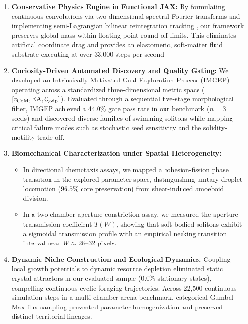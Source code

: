 \begin{enumerate}
    \item \textbf{Conservative Physics Engine in Functional JAX:} By formulating continuous convolutions via two-dimensional spectral Fourier transforms and implementing semi-Lagrangian bilinear reintegration tracking \parencite{moroz2020reintegration, plantec2025flowlenia}, our framework preserves global mass within floating-point round-off limits. This eliminates artificial coordinate drag and provides an elastomeric, soft-matter fluid substrate executing at over 33,000 steps per second.
    \item \textbf{Curiosity-Driven Automated Discovery and Quality Gating:} We developed an Intrinsically Motivated Goal Exploration Process (IMGEP) operating across a standardized three-dimensional metric space ($[v_{\text{CoM}}, \text{EA}, \mathcal{C}_{\text{gzip}}]$). Evaluated through a sequential five-stage morphological filter, IMGEP achieved a 44.0\% gate pass rate in our benchmark ($n=3$ seeds) and discovered diverse families of swimming solitons while mapping critical failure modes such as stochastic seed sensitivity and the solidity-motility trade-off.
    \item \textbf{Biomechanical Characterization under Spatial Heterogeneity:} 
    \begin{itemize}
        \item In directional chemotaxis assays, we mapped a cohesion-fission phase transition in the explored parameter space, distinguishing unitary droplet locomotion ($96.5\%$ core preservation) from shear-induced amoeboid division.
        \item In a two-chamber aperture constriction assay, we measured the aperture transmission coefficient $T(W)$, showing that soft-bodied solitons exhibit a sigmoidal transmission profile with an empirical necking transition interval near $W \approx 28\text{--}32\text{ pixels}$.
    \end{itemize}
    \item \textbf{Dynamic Niche Construction and Ecological Dynamics:} Coupling local growth potentials to dynamic resource depletion eliminated static crystal attractors in our evaluated sample ($0.0\%$ stationary states), compelling continuous cyclic foraging trajectories. Across 22,500 continuous simulation steps in a multi-chamber arena benchmark, categorical Gumbel-Max flux sampling prevented parameter homogenization and preserved distinct territorial lineages.
\end{enumerate}

